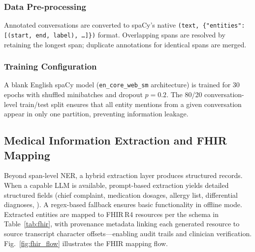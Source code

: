 \documentclass[conference]{IEEEtran}
\begin{document}
\subsubsection{Data Pre-processing}

Annotated conversations are converted to spaCy's native
\texttt{(text, \{"entities": [(start, end, label), \ldots]\})} format.
Overlapping spans are resolved by retaining the longest span; duplicate
annotations for identical spans are merged.

\subsubsection{Training Configuration}

A blank English spaCy model (\texttt{en\_core\_web\_sm} architecture) is
trained for 30\,epochs with shuffled minibatches and dropout
$p\!=\!0.2$. The 80/20 conversation-level train/test split ensures that
all entity mentions from a given conversation appear in only one partition,
preventing information leakage.

\subsection{Medical Information Extraction and FHIR Mapping}
\label{subsec:fhir}

Beyond span-level NER, a hybrid extraction layer produces structured records.
When a capable LLM is available, prompt-based extraction yields detailed
structured fields (chief complaint, medication dosages, allergy list,
differential diagnoses, \etc). A regex-based fallback ensures basic
functionality in offline mode. Extracted entities are mapped to FHIR\,R4
resources per the schema in Table~\ref{tab:fhir}, with provenance metadata
linking each generated resource to source transcript character offsets—enabling
audit trails and clinician verification. Fig.~\ref{fig:fhir_flow} illustrates
the FHIR mapping flow.
\end{document}
